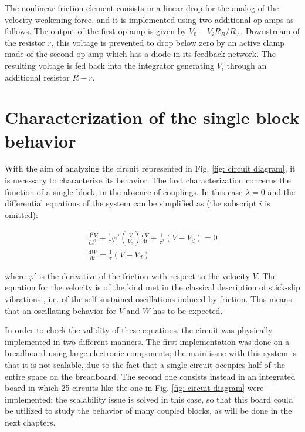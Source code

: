 The nonlinear friction element consists in a linear drop for the analog of the velocity-weakening force, and it is
implemented using two additional op-amps as follows. The output of the first op-amp is given by $V_0-V_iR_B/R_A$.
Downstream of the resistor $r$, this voltage is prevented to drop below zero by an active
clamp made of the second op-amp which has a diode in its feedback network. The resulting voltage is fed back into
the integrator generating $V_i$ through an additional resistor $R-r$.


\section{Characterization of the single block behavior}
\label{sec: single block characterization}

With the aim of analyzing the circuit represented in Fig. \ref{fig: circuit diagram},
it is necessary to characterize its behavior. The first characterization concerns the
function of a single block, in the absence of couplings.
In this case $\lambda=0$ and the differential equations of the system can be simplified as
(the subscript $i$ is omitted):

\begin{equation}
\label{eq: single block eq motion}
\begin{gathered}
    \frac{\text{d}^2V}{\text{d}t^2}+
    \frac{1}{\tau}\varphi'\left(\frac{V}{V_0}\right)\frac{\text{d}V}{\text{d}t}+
    \frac{1}{\tau^2}(V-V_d)=0\\[10pt]
    \frac{\text{d}W}{\text{d}t}=\frac{1}{\tau}(V-V_d)
\end{gathered}
\end{equation}

where $\varphi'$ is the derivative of the friction with respect to the velocity $V$.
The equation for the velocity is of the kind met in the classical description of stick-slip
vibrations \cite{ref:stick_slip}, i.e. of the self-sustained oscillations induced by friction.
This means that an oscillating behavior for $V$ and $W$ has to be expected.

In order to check the validity of these equations, the circuit was physically implemented
in two different manners. The first implementation was done on a breadboard using large
electronic components; the main issue with this system is that it is not scalable,
due to the fact that a single circuit occupies half of the entire space on the breadboard.
The second one consists instead in an integrated board in which 25 circuits
like the one in Fig. \ref{fig: circuit diagram} were implemented;
the scalability issue is solved in this case, so that this board could be utilized
to study the behavior of many coupled blocks, as will be done in the next chapters.

